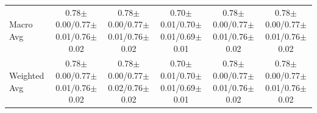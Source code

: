 \documentclass[10pt,a4paper,parskip=half-]{scrartcl}
\begin{document}
\begin{landscape}
\begin{table}[H]
{\begin{tabular}{l|cccc|cccc|cccc|cccc|cccc}
Macro Avg & \multicolumn{4}{c|}{0.78$\pm$0.00/0.77$\pm$0.01/0.76$\pm$0.02} & \multicolumn{4}{c|}{0.78$\pm$0.00/0.77$\pm$0.01/0.76$\pm$0.02} & \multicolumn{4}{c|}{0.70$\pm$0.01/0.70$\pm$0.01/0.69$\pm$0.01} & \multicolumn{4}{c|}{0.78$\pm$0.00/0.77$\pm$0.01/0.76$\pm$0.02} & \multicolumn{4}{c}{0.78$\pm$0.00/0.77$\pm$0.01/0.76$\pm$0.02} \\
Weighted Avg & \multicolumn{4}{c|}{0.78$\pm$0.00/0.77$\pm$0.01/0.76$\pm$0.02} & \multicolumn{4}{c|}{0.78$\pm$0.00/0.77$\pm$0.02/0.76$\pm$0.02} & \multicolumn{4}{c|}{0.70$\pm$0.01/0.70$\pm$0.01/0.69$\pm$0.01} & \multicolumn{4}{c|}{0.78$\pm$0.00/0.77$\pm$0.01/0.76$\pm$0.02} & \multicolumn{4}{c}{0.78$\pm$0.00/0.77$\pm$0.01/0.76$\pm$0.02} \\
\bottomrule
\end{tabular}}
\end{table}

\end{landscape}
\FloatBarrier
\end{document}
